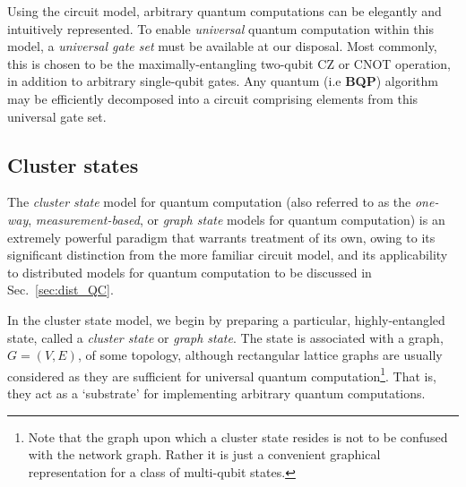 \documentclass[aps,rmp,twocolumn,amsmath,amssymb,nofootinbib,superscriptaddress,longbibliography,floatfix,table-of-contents,eqsecnum]{revtex4-1}
\begin{document}
Using the circuit model, arbitrary quantum computations can be elegantly and intuitively represented. To enable \textit{universal} quantum computation within this model, a \textit{universal gate set} must be available at our disposal. Most commonly, this is chosen to be the maximally-entangling two-qubit CZ or CNOT operation, in addition to arbitrary single-qubit gates. Any quantum (i.e \textbf{BQP}) algorithm may be efficiently decomposed into a circuit comprising elements from this universal gate set.

%
%

\subsection{Cluster states} \label{sec:CSQC} 

The \textit{cluster state} model for quantum computation \cite{bib:Raussendorf01, bib:Raussendorf03, bib:Nielsen06} (also referred to as the \textit{one-way}, \textit{measurement-based}, or \textit{graph state} models for quantum computation) is an extremely powerful paradigm that warrants treatment of its own, owing to its significant distinction from the more familiar circuit model, and its applicability to distributed models for quantum computation to be discussed in Sec.~\ref{sec:dist_QC}.

In the cluster state model, we begin by preparing a particular, highly-entangled state, called a \textit{cluster state} or \textit{graph state}. The state is associated with a graph, $G=(V,E)$, of some topology, although rectangular lattice graphs are usually considered as they are sufficient for universal quantum computation\footnote{Note that the graph upon which a cluster state resides is not to be confused with the network graph. Rather it is just a convenient graphical representation for a class of multi-qubit states.}. That is, they act as a `substrate' for implementing arbitrary quantum computations.
\end{document}
